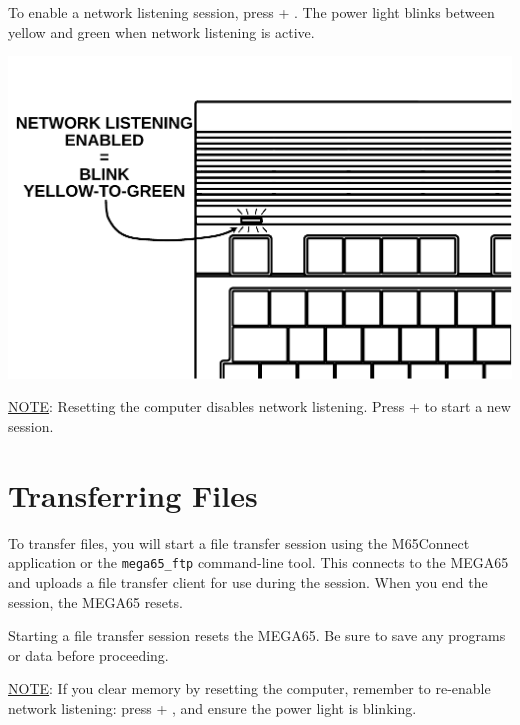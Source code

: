 To enable a network listening session, press  + \megakey{\pounds}. The power light blinks between yellow and green when network listening is active.

\begin{center}
\includegraphics[width=\linewidth]{images/illustrations/mega65-eth-blink.pdf}
\end{center}

\underline{NOTE}: Resetting the computer disables network listening. Press  + \megakey{\pounds} to start a new session.

\section{Transferring Files}

To transfer files, you will start a file transfer session using the M65Connect application or the {\tt mega65\_ftp} command-line tool. This connects to the MEGA65 and uploads a file transfer client for use during the session. When you end the session, the MEGA65 resets.

Starting a file transfer session resets the MEGA65. Be sure to save any programs or data before proceeding.

\underline{NOTE}: If you clear memory by resetting the computer, remember to re-enable network listening: press  + \megakey{\pounds}, and ensure the power light is blinking.



